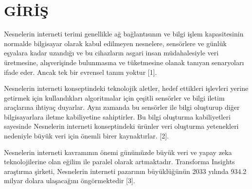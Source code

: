 \section{GİRİŞ}


\begin{comment}
Giriş bölümünde çalışmanın genel bir tarifi verilir, konusu, amacı,
çalışma kapsamı, yöntem ve aşamalar özetlenir. Alt başlıklar verilerek
detaylandırılır ve daha detaylı açıklamalar yapılır. Örneğin
\textbf{1.1. Genel Bilgiler} alt başlığı altında

\begin{itemize}
\item
  \begin{quote}
  Yapılan çalışmanın genel bir tarifi verilmelidir
  \end{quote}
\item
  \begin{quote}
  Bu konunun neden seçildiği açıklanmalıdır
  \end{quote}
\item
  \begin{quote}
  Bu çalkışma sonucunda ilgili konuya sağlanacak yeniliklerden
  bahsedilmelidir.
  \end{quote}
\item
  \begin{quote}
  Bu konunun ya da uygulamanın günümüzde nerelerde nasıl ve niçin
  kullanıldığı bilgileri verilmelidir
  \end{quote}
\end{itemize}
\end{comment}


Nesnelerin interneti terimi genellikle ağ bağlantısının ve bilgi işlem kapasitesinin normalde bilgisayar olarak kabul edilmeyen nesnelere, sensörlere ve günlük eşyalara kadar uzandığı ve bu cihazların asgari insan müdahalesiyle veri üretmesine, alışverişinde bulunmasına ve tüketmesine olanak tanıyan senaryoları ifade eder. Ancak tek bir evrensel tanım yoktur [1].

Nesnelerin interneti konseptindeki teknolojik aletler, hedef ettikleri işlevleri yerine getirmek için kullandıkları algoritmalar için çeşitli sensörler ve bilgi iletim araçlarına ihtiyaç duyarlar. Aynı zamanda bu sensörler ile bilgi oluşturup diğer bilgisayarlara iletme kabiliyetine sahiptirler. Bu bilgi oluşturma kabiliyetleri sayesinde Nesnelerin interneti konseptindeki ürünler veri oluşturma yetenekleri nedeniyle büyük veri için önemli birer kaynaktırlar.  [2].

Nesnelerin interneti kavramının önemi günümüzde büyük veri ve yapay zeka teknolojilerine olan eğilim ile paralel olarak artmaktadır. Transforma Insights araştırma şirketi, Nesnelerin interneti pazarının büyüklüğünün 2033 yılında 934.2 milyar dolara ulaşacağını öngörmektedir [3].

